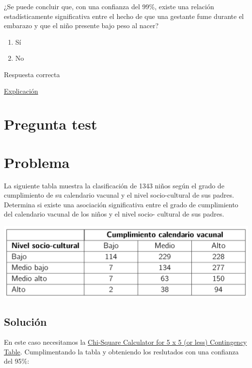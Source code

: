 \documentclass[
]{book}
\providecommand{\tightlist}{%
  \setlength{\itemsep}{0pt}\setlength{\parskip}{0pt}}
\begin{document}
¿Se puede concluir que, con una confianza del 99\%, existe una relación estadísticamente significativa entre el hecho de que una gestante fume durante el embarazo y que el niño presente bajo peso al nacer?

\begin{enumerate}
\def\labelenumi{\alph{enumi})}
\tightlist
\item
  Sí
\item
  No
\end{enumerate}

Respuesta correcta

\href{https://1fjmanzano.github.io/bioestadistica/me\%CC\%81todos-de-inferencia-estadi\%CC\%81stica.html\#prueba-de-la-chi-cuadrado}{Explicación}

\hypertarget{pregunta-test-152}{%
\section{Pregunta test}\label{pregunta-test-152}}

\hypertarget{problema-16}{%
\section{Problema}\label{problema-16}}

La siguiente tabla muestra la clasificación de 1343 niños según el grado de cumplimiento de su calendario vacunal y el nivel socio-cultural de sus padres. Determina si existe una asociación significativa entre el grado de cumplimiento del calendario vacunal de los niños y el nivel socio- cultural de sus padres.

\includegraphics[width=19.11in]{img/5_4}

\hypertarget{soluciuxf3n-12}{%
\subsection{Solución}\label{soluciuxf3n-12}}

En este caso necesitamos la \href{https://www.socscistatistics.com/tests/chisquare2/default2.aspx}{Chi-Square Calculator for 5 x 5 (or less) Contingency Table}. Cumplimentando la tabla y obteniendo los reslutados con una confianza del 95\%:
\end{document}
